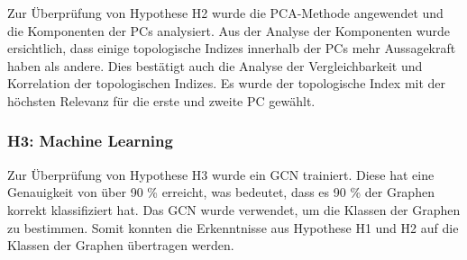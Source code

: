Zur Überprüfung von Hypothese H2 wurde die PCA-Methode angewendet und die Komponenten der PCs analysiert.
Aus der Analyse der Komponenten wurde ersichtlich, dass einige topologische Indizes innerhalb der PCs mehr Aussagekraft haben als andere.
Dies bestätigt auch die Analyse der Vergleichbarkeit und Korrelation der topologischen Indizes.
Es wurde der topologische Index mit der höchsten Relevanz für die erste und zweite PC gewählt.

\subsubsection{H3: Machine Learning}

Zur Überprüfung von Hypothese H3 wurde ein GCN trainiert.
Diese hat eine Genauigkeit von über 90 \% erreicht, was bedeutet, dass es 90 \% der Graphen korrekt klassifiziert hat.
Das GCN wurde verwendet, um die Klassen der Graphen zu bestimmen.
Somit konnten die Erkenntnisse aus Hypothese H1 und H2 auf die Klassen der Graphen übertragen werden.